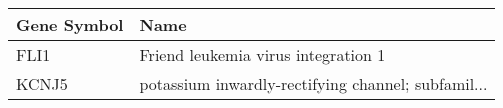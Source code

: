 \begin{tabular}{ll}
\toprule
Gene Symbol &                                               Name \\
\midrule
       FLI1 &                Friend leukemia virus integration 1 \\
      KCNJ5 & potassium inwardly-rectifying channel; subfamil... \\
\bottomrule
\end{tabular}
